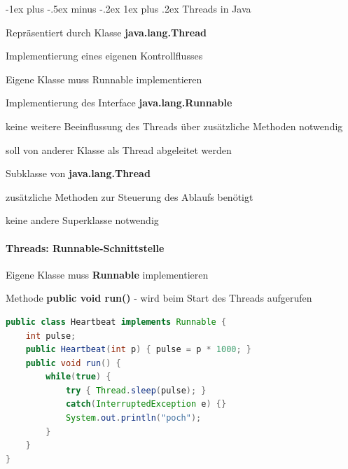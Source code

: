 \documentclass[10pt]{article}
\makeatletter
\renewcommand{\subsubsection}{\@startsection{subsubsection}{3}{0mm}%
                                {-1ex plus -.5ex minus -.2ex}%
                                {1ex plus .2ex}%
                                {\normalfont\small\bfseries}}
\makeatother
\begin{document}
  \subsubsection{Threads in Java}
  \begin{itemize*}
    \item Repräsentiert durch Klasse \textbf{java.lang.Thread}
    \item Implementierung eines eigenen Kontrollflusses
    \item Eigene Klasse muss Runnable implementieren
    \begin{itemize*}
      \item Implementierung des Interface \textbf{java.lang.Runnable}
      \begin{itemize*}
        \item keine weitere Beeinflussung des Threads über zusätzliche Methoden notwendig
        \item soll von anderer Klasse als Thread abgeleitet werden
      \end{itemize*}
      \item Subklasse von \textbf{java.lang.Thread}
      \begin{itemize*}
        \item zusätzliche Methoden zur Steuerung des Ablaufs benötigt
        \item keine andere Superklasse notwendig
      \end{itemize*}
    \end{itemize*}
  \end{itemize*}
  
  \paragraph{Threads: Runnable-Schnittstelle}
  Eigene Klasse muss \textbf{Runnable} implementieren
  \begin{itemize*}
    \item Methode \textbf{public void run()} - wird beim Start des Threads aufgerufen
  \end{itemize*}
  \begin{lstlisting}[language=java]
public class Heartbeat implements Runnable {
    int pulse;
    public Heartbeat(int p) { pulse = p * 1000; }
    public void run() {
        while(true) {
            try { Thread.sleep(pulse); }
            catch(InterruptedException e) {}
            System.out.println("poch");
        }
    }
}
\end{lstlisting}
  
\end{document}
